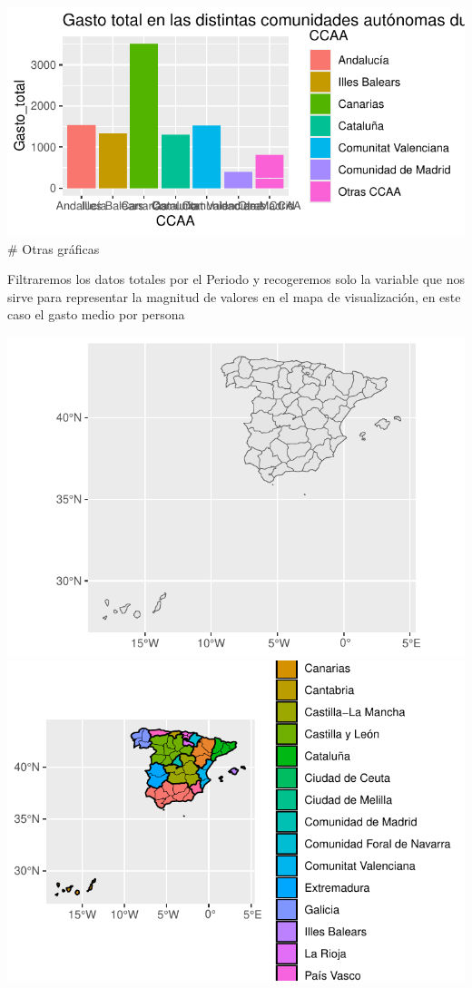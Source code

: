 \documentclass[data,article,submit,moreauthors,pdftex]{Definitions/mdpi}
\begin{document}
\includegraphics{ProyectoAED2024_Rmd_files/figure-latex/gasto comunidades covid-1}
\# Otras gráficas

Filtraremos los datos totales por el Periodo y recogeremos solo la
variable que nos sirve para representar la magnitud de valores en el
mapa de visualización, en este caso el gasto medio por persona

\includegraphics{ProyectoAED2024_Rmd_files/figure-latex/unnamed-chunk-38-1}
\includegraphics{ProyectoAED2024_Rmd_files/figure-latex/unnamed-chunk-38-2}
\end{document}
